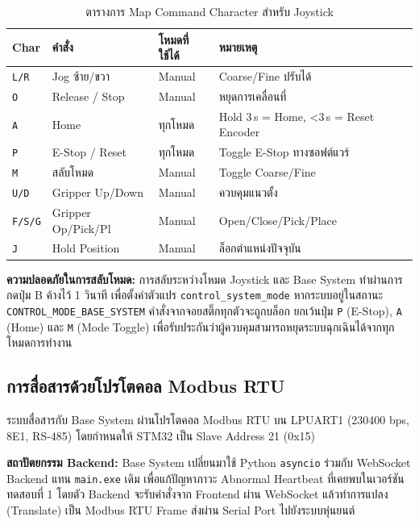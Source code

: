 \begin{table}[H]
  \centering
  \caption{ตารางการ Map Command Character สำหรับ Joystick}
  \label{tab:joystick_map_fw}
  \small
  \begin{tabular}{>{\raggedright\arraybackslash}p{3.5cm} >{\raggedright\arraybackslash}p{3.5cm} >{\raggedright\arraybackslash}p{3.5cm} >{\raggedright\arraybackslash}p{3.0cm}}
    \toprule
    Char & คำสั่ง & โหมดที่ใช้ได้ & หมายเหตุ \\
    \midrule
    \texttt{L/R} & Jog ซ้าย/ขวา & Manual & Coarse/Fine ปรับได้ \\
    \texttt{O}   & Release / Stop & Manual & หยุดการเคลื่อนที่ \\
    \texttt{A}   & Home & ทุกโหมด & Hold 3\,s = Home, <3\,s = Reset Encoder \\
    \texttt{P}   & E-Stop / Reset & ทุกโหมด & Toggle E-Stop ทางซอฟต์แวร์ \\
    \texttt{M}   & สลับโหมด & Manual & Toggle Coarse/Fine \\
    \texttt{U/D} & Gripper Up/Down & Manual & ควบคุมแนวตั้ง \\
    \texttt{F/S/G}& Gripper Op/Pick/Pl & Manual & Open/Close/Pick/Place \\
    \texttt{J}   & Hold Position & Manual & ล็อกตำแหน่งปัจจุบัน \\
    \bottomrule
  \end{tabular}
\end{table}

\textbf{ความปลอดภัยในการสลับโหมด:} การสลับระหว่างโหมด Joystick และ Base System ทำผ่านการกดปุ่ม B ค้างไว้ 1 วินาที เพื่อตั้งค่าตัวแปร \texttt{control\_system\_mode} หากระบบอยู่ในสถานะ \texttt{CONTROL\_MODE\_BASE\_SYSTEM} คำสั่งจากจอยสติ๊กทุกตัวจะถูกบล็อก ยกเว้นปุ่ม \texttt{P} (E-Stop), \texttt{A} (Home) และ \texttt{M} (Mode Toggle) เพื่อรับประกันว่าผู้ควบคุมสามารถหยุดระบบฉุกเฉินได้จากทุกโหมดการทำงาน

\subsection{การสื่อสารด้วยโปรโตคอล Modbus RTU}
\label{subsec:modbus_integration}

ระบบสื่อสารกับ Base System ผ่านโปรโตคอล Modbus RTU บน LPUART1 (230400 bps, 8E1, RS-485) โดยกำหนดให้ STM32 เป็น Slave Address 21 (0x15) 

\textbf{สถาปัตยกรรม Backend:} Base System เปลี่ยนมาใช้ Python \texttt{asyncio} ร่วมกับ WebSocket Backend แทน \texttt{main.exe} เดิม เพื่อแก้ปัญหาภาวะ Abnormal Heartbeat ที่เคยพบในเวอร์ชันทดสอบที่ 1 โดยตัว Backend จะรับคำสั่งจาก Frontend ผ่าน WebSocket แล้วทำการแปลง (Translate) เป็น Modbus RTU Frame ส่งผ่าน Serial Port ไปยังระบบหุ่นยนต์

